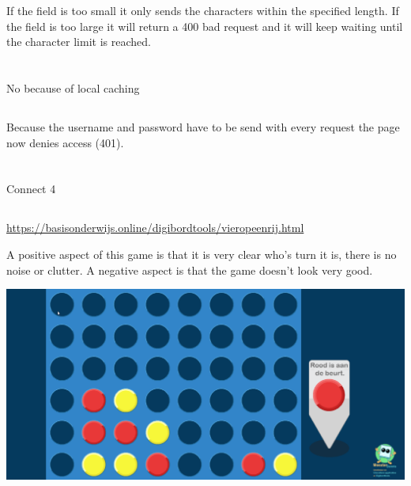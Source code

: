 \documentclass{article}
\begin{document}
     If the field is too small it only sends the characters within the specified length.
     If the field is too large it will return a 400 bad request and it will keep waiting until the character limit is reached.

     \section{}
     \subsection{}

     No because of local caching

     \subsection{}

     Because the username and password have to be send with every request the page now denies access (401).

     \section{}
     \subsection{}
     Connect 4

     \subsection{}
     \url{https://basisonderwijs.online/digibordtools/vieropeenrij.html}
     
     A positive aspect of this game is that it is very clear who's turn it is, there is no noise or clutter. A negative aspect is that the game doesn't look very good.
     
     \includegraphics[width=\linewidth]{3}
     
\end{document}
